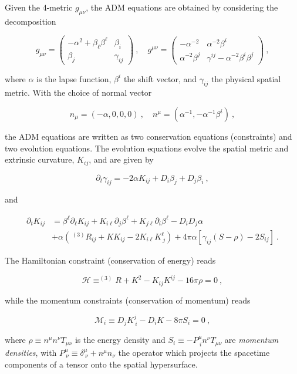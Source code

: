 \documentclass[a4paper,11pt]{article}
\renewcommand{\a}{\alpha}
\renewcommand{\b}{\beta}
\renewcommand{\d}{\delta}
\newcommand{\g}{\gamma}
\newcommand{\gDD}[2]{\g_{{#1}{#2}}}
\newcommand{\gUU}[2]{\g^{{#1}{#2}}}
\newcommand{\GDD}[2]{g_{{#1}{#2}}}
\newcommand{\GUU}[2]{g^{{#1}{#2}}}
\newcommand{\pd}{\partial}
\newcommand{\nn}{\nonumber}
\renewcommand{\H}{\mathcal{H}}
\newcommand{\M}{\mathcal{M}}
\newcommand{\lrpar}[1]{\left( #1 \right)}
\newcommand{\lrsquare}[1]{\left[ #1 \right]}
\newcommand{\n}{\noindent}
\newcommand{\eq}[1]{
  \begin{equation}
    #1
  \end{equation}
}
\newcommand{\al}[1]{
  \begin{align}
    #1
  \end{align}
}
\newcommand{\parboxbreak}[2]{
  
  \vspace*{0.25in}
  
  \begin{tcolorbox}[breakable, pad at break=1mm, before=\centering,title=Box #1,colback=blue!5!white,colframe=gray!75!black]
    #2
  \end{tcolorbox}

  \vspace*{0.25in}

}
\begin{document}
\parboxbreak{1: The ADM equations}{

  Given the 4-metric $\GDD{\mu}{\nu}$, the ADM equations are obtained by considering the decomposition

  \eq{
    \GDD{\mu}{\nu} =
    \begin{pmatrix}
      -\a^{2} + \b_{\ell}\b^{\ell} & \b_{i}\\
      \b_{j} & \gDD{i}{j}
    \end{pmatrix}\ ,
    \quad
    \GUU{\mu}{\nu} =
    \begin{pmatrix}
      -\a^{-2} & \a^{-2}\b^{i}\\
      \a^{-2}\b^{j} & \gUU{i}{j} - \a^{-2}\b^{i}\b^{j}
    \end{pmatrix}\ ,\nn
  }

  \n where $\a$ is the lapse function, $\b^{i}$ the shift vector, and $\gDD{i}{j}$ the physical spatial metric. With the choice of normal vector

  \eq{ n_{\mu} = \lrpar{-\a,0,0,0}\ ,\quad n^{\mu} = \lrpar{\a^{-1},-\a^{-1}\b^{i}}\ ,\nn}

  \n the ADM equations are written as two conservation equations (constraints) and two evolution equations. The evolution equations evolve the spatial metric and extrinsic curvature, $K_{ij}$, and are given by

  \eq{ \pd_{t}\g_{ij} = -2\a K_{ij} + D_{i}\b_{j} + D_{j}\b_{i}\ ,\nn }

  \n and

  \al{
    \pd_{t} K_{ij} &= \b^{\ell}\pd_{\ell}K_{ij} + K_{i\ell}\pd_{j}\b^{\ell} + K_{j\ell}\pd_{i}\b^{\ell} - D_{i}D_{j}\a\nn\\
                  &+\a\lrpar{\,^{(3)}\!R_{ij} + K K_{ij} - 2K_{i\ell}K^{\ell}_{\ j}} + 4\pi\a\lrsquare{\g_{ij}\lrpar{S-\rho} -2S_{ij}}\ .\nn
  }

  The Hamiltonian constraint (conservation of energy) reads

  \eq{ \H \equiv ^{(3)}\!R + K^{2} - K_{ij}K^{ij} - 16\pi\rho = 0\ ,\nn }

  \n while the momentum constraints (conservation of momentum) reads

  \eq{ \M_{i} \equiv D_{j}K^{j}_{\ i} - D_{i}K - 8\pi S_{i} = 0\ , \nn}

  \noindent where $\rho\equiv n^{\mu}n^{\nu}T_{\mu\nu}$ is the energy density and $S_{i} \equiv - P^{\mu}_{\ i}n^{\nu}T_{\mu\nu}$ are \emph{momentum densities}, with $P^{\mu}_{\ \nu} \equiv \d^{\mu}_{\ \nu} + n^{\mu}n_{\nu}$ the operator which projects the spacetime components of a tensor onto the spatial hypersurface.
}
\end{document}
